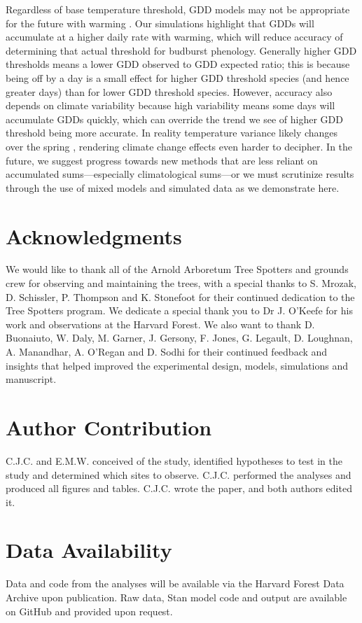 \documentclass{article}\usepackage[]{graphicx}\usepackage[]{color}
\begin{document}
Regardless of base temperature threshold, GDD models may not be appropriate for the future with warming \citep{Man2010}. Our simulations highlight that GDDs will accumulate at a higher daily rate with warming, which will reduce accuracy of determining that actual threshold for budburst phenology. Generally higher GDD thresholds means a lower GDD observed to GDD expected ratio; this is because being off by a day is a small effect for higher GDD threshold species (and hence greater days) than for lower GDD threshold species. However, accuracy also depends on climate variability because high variability means some days will accumulate GDDs quickly, which can override the trend we see of higher GDD threshold being more accurate. In reality temperature variance likely changes over the spring \citep{Qu2014}, rendering climate change effects even harder to decipher. In the future, we suggest progress towards new methods that are less reliant on accumulated sums---especially climatological sums---or we must scrutinize results through the use of mixed models and simulated data as we demonstrate here.

\section*{Acknowledgments}
We would like to thank all of the Arnold Arboretum Tree Spotters and grounds crew for observing and maintaining the trees, with a special thanks to S. Mrozak, D. Schissler, P. Thompson and K. Stonefoot for their continued dedication to the Tree Spotters program. We dedicate a special thank you to Dr J. O'Keefe for his work and observations at the Harvard Forest. We also want to thank D. Buonaiuto, W. Daly, M. Garner, J. Gersony, F. Jones, G. Legault, D. Loughnan, A. Manandhar, A. O'Regan and D. Sodhi for their continued feedback and insights that helped improved the experimental design, models, simulations and manuscript. 

\section*{Author Contribution} 
C.J.C. and E.M.W. conceived of the study, identified hypotheses to test in the study and determined which sites to observe. C.J.C. performed the analyses and produced all figures and tables. C.J.C. wrote the paper, and both authors edited it.

\section*{Data Availability}
Data and code from the analyses will be available via the Harvard Forest Data Archive upon publication. Raw data, {Stan} model code and output are available on GitHub and provided upon request.
\end{document}
